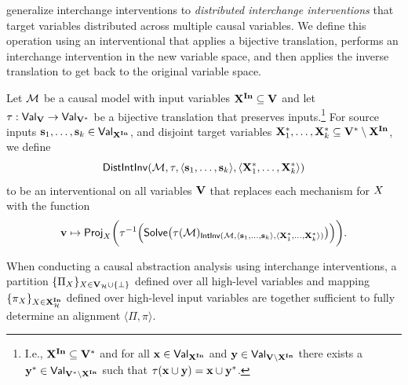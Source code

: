 \documentclass[twoside,11pt]{article}
\begin{document}
\cite{Geiger-etal:2023:DAS} generalize interchange interventions to \textit{distributed interchange interventions} that target variables distributed across multiple causal variables. We define this operation using an interventional that applies a bijective translation, performs an interchange intervention in the new variable space, and then applies the inverse translation to get back to the original variable space. 
\begin{definition}\label{def:distinterchange}
Let $\mathcal{M}$ be a causal model with input variables $\mathbf{X}^{\mathbf{In}} \subseteq \mathbf{V}$ and let $\tau:\mathsf{Val}_{\mathbf{V}} \to \mathsf{Val}_{\mathbf{V}^*}$ be a bijective translation that preserves inputs.\footnote{I.e., $\mathbf{X}^{\mathbf{In}} \subseteq \mathbf{V}^*$ and for all $\mathbf{x} \in \mathsf{Val}_{\mathbf{X}^{\mathbf{In}}}$ and $\mathbf{y} \in \mathsf{Val}_{\mathbf{V} \setminus \mathbf{X}^{\mathbf{In}}}$ there exists a $\mathbf{y}^* \in \mathsf{Val}_{\mathbf{V}^* \setminus \mathbf{X}^{\mathbf{In}}}$ such that $\tau(\mathbf{x} \cup \mathbf{y} ) = \mathbf{x} \cup \mathbf{y}^*$.} For source inputs $\mathbf{s}_1, \dots, \mathbf{s}_k \in \mathsf{Val}_{\mathbf{X}^{\mathbf{In}}}$, and disjoint target variables $\mathbf{X}^*_1, \dots, \mathbf{X}^*_k \subseteq \mathbf{V}^* \setminus \mathbf{X}^{\mathbf{In}}$, we define
\[ \mathsf{DistIntInv}(\mathcal{M}, \tau, \langle \mathbf{s}_1, \dots ,\mathbf{s}_k \rangle, \langle \mathbf{X}^*_1, \dots, \mathbf{X}^*_k\rangle)\]
to be an interventional on all variables $\mathbf{V}$ that replaces each mechanism for $X$ with the function
\[\mathbf{v} \mapsto \mathsf{Proj}_{X}\bigg(\tau^{-1} \Big( \mathsf{Solve}\big(\tau(\mathcal{M})_{\mathsf{IntInv}(\mathcal{M},\langle \mathbf{s}_1, \dots ,\mathbf{s}_k \rangle, \langle \mathbf{X}^*_1, \dots, \mathbf{X}^*_k\rangle)}\big) \Big)\bigg) .\]
\end{definition}


When conducting a causal abstraction analysis using interchange interventions, a partition $\{\Pi_{X}\}_{X \in \mathbf{V}_{\mathcal{H}} \cup \{\bot\}}$ defined over all high-level variables and mapping $\{\pi_{X}\}_{X \in \mathbf{X}^{\mathbf{In}}_{\mathcal{H}}}$ defined over high-level input variables are together sufficient to fully determine an alignment $\langle \Pi, \pi \rangle$.
\end{document}
